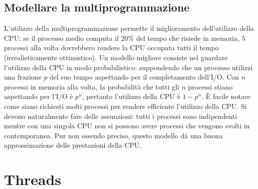 \subsection{Modellare la multiprogrammazione}
L'utilizzo della multiprogrammazione permette il miglioramento dell'utilizzo della CPU: se il processo medio computa il $20\%$ del tempo che risiede in memoria, $5$ processi alla volta
dovrebbero rendere la CPU occupata tutti il tempo (irrealisticamente ottimistico). Un modello migliore consiste nel guardare l'utilizzo della CPU in modo probabilistico: suppondendo che
un processo utilizzi una frazione $p$ del suo tempo aspettando per il completamento dell'I/O. Con $n$ processi in memoria alla volta, la probabilit\`a che tutti gli $n$ processi stiano
aspettando per l'I/O \`e $p^n$, pertanto l'utilizzo della CPU \`e $1-p^n$. \`E facile notare come siano richiesti molti processi per rendere efficiente l'utilizzo della CPU. Si devono
naturalmente fare delle assunzioni: tutti i processi sono indipendenti mentre con una singola CPU non si possono avere processi che vengono svolti in contemporanea. Pur non essendo 
preciso, questo modello d\`a una buona approssimazione delle prestazioni della CPU. 
\section{Threads}
